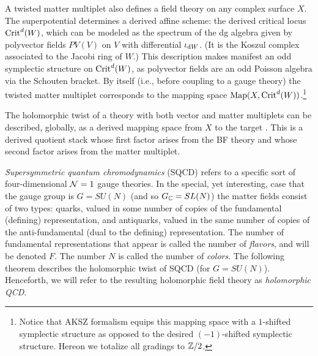 \documentclass[11pt]{amsart}
\begin{document}
\def\Sslash{\!\sslash\!}

A twisted matter multiplet also defines a field theory on any complex surface $X$. 
The superpotential determines a derived affine scheme: the derived critical locus ${\rm Crit}^d(W)$, which can be modeled as the spectrum of the dg algebra given by polyvector fields $PV(V)$ on $V$ with differential $\iota_{{\rm d} W}$.
(It is the Koszul complex associated to the Jacobi ring of $W$.)
This description makes manifest an odd symplectic structure on ${\rm Crit}^d(W)$,
as polyvector fields are an odd Poisson algebra via the Schouten bracket.
By itself (i.e., before coupling to a gauge theory) the twisted matter multiplet corresponds to the mapping space ${\rm Map}(X, {\rm Crit}^d(W))$.\footnote{Notice that AKSZ formalism equips this mapping space with a $1$-shifted symplectic structure as opposed to the desired $(-1)$-shifted symplectic structure.
Hereon we totalize all gradings to $\mathbb Z/2$.}

The holomorphic twist of a theory with both vector and matter multiplets can be described, globally, as a derived mapping space from $X$ to the target
 .
\eeqn
This is a derived quotient stack whose first factor arises from the BF theory and whose second factor arises from the matter multiplet.

\textit{Supersymmetric quantum chromodynamics} (SQCD) refers to a specific sort of four-dimensional $\mathcal N=1$ gauge theories.
In the special, yet interesting, case that the gauge group is $G = SU(N)$ (and so $G_\mathbb C = SL(N)$) the  matter fields consist of two types: quarks, valued in some number of copies of the fundamental (defining) representation, and antiquarks, valued in the same number of copies of the anti-fundamental (dual to the defining) representation.
The number of fundamental representations that appear is called the number of \textit{flavors}, and will be denoted $F$.
The number $N$ is called the number of \textit{colors}.
The following theorem describes the holomorphic twist of SQCD (for $G = SU(N)$). 
Henceforth, we will refer to the resulting holomorphic field theory as \textit{holomorphic QCD}.

\end{document}
